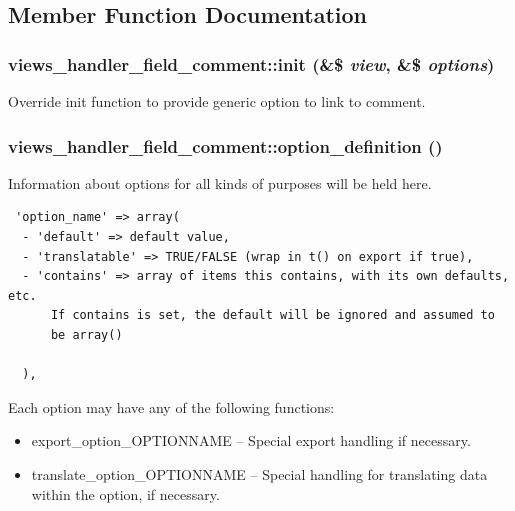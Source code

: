 \subsection{Member Function Documentation}
\hypertarget{classviews__handler__field__comment_284d26dff5d2ddba3a2f692bf375d770}{
\subsubsection[{init}]{\setlength{\rightskip}{0pt plus 5cm}views\_\-handler\_\-field\_\-comment::init (\&\$ {\em view}, \/  \&\$ {\em options})}}
\label{classviews__handler__field__comment_284d26dff5d2ddba3a2f692bf375d770}


Override init function to provide generic option to link to comment. \hypertarget{classviews__handler__field__comment_73136303aae33442ce2ea156c1262b22}{
\subsubsection[{option\_\-definition}]{\setlength{\rightskip}{0pt plus 5cm}views\_\-handler\_\-field\_\-comment::option\_\-definition ()}}
\label{classviews__handler__field__comment_73136303aae33442ce2ea156c1262b22}


Information about options for all kinds of purposes will be held here. 

\begin{Code}\begin{verbatim} 'option_name' => array(
  - 'default' => default value,
  - 'translatable' => TRUE/FALSE (wrap in t() on export if true),
  - 'contains' => array of items this contains, with its own defaults, etc.
      If contains is set, the default will be ignored and assumed to
      be array()

  ),
\end{verbatim}
\end{Code}

 Each option may have any of the following functions:\begin{itemize}
\item export\_\-option\_\-OPTIONNAME -- Special export handling if necessary.\item translate\_\-option\_\-OPTIONNAME -- Special handling for translating data within the option, if necessary. \end{itemize}


